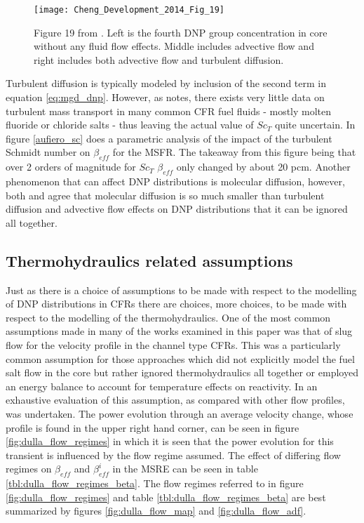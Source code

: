 \documentclass[review]{elsarticle}
\begin{document}
\begin{figure}[h]
   \centering
   \texttt{[image: Cheng\_Development\_2014\_Fig\_19]}
   \caption{Figure 19 from \cite{cheng_development_2014}. Left is the fourth
   DNP group concentration in core without any fluid flow effects. Middle
   includes advective flow and right includes both advective flow and
   turbulent diffusion.} 
   \label{fig:cheng_diffusion}
\end{figure}

Turbulent diffusion is typically modeled by inclusion of the second term in
equation \ref{eq:mgd_dnp}. However, as \cite{aufiero_calculating_2014} notes,
there exists very little data on turbulent mass transport in many common
CFR fuel fluids - mostly molten fluoride or chloride salts - thus leaving the
actual value of $Sc_{T}$ quite uncertain. In figure \ref{aufiero_sc}
\cite{aufiero_calculating_2014} does a parametric analysis of the impact of the
turbulent Schmidt number on $\beta_{eff}$ for the MSFR. The takeaway from this
figure being that over 2 orders of magnitude for $Sc_{T}$ $\beta_{eff}$ only
changed by about 20 pcm. Another phenomenon that can affect DNP distributions
is molecular diffusion, however, both \cite{aufiero_calculating_2014} and
\cite{cheng_development_2014} agree that molecular diffusion is so much smaller
than turbulent diffusion and advective flow effects on DNP distributions that it
can be ignored all together.

\subsection{Thermohydraulics related assumptions} \label{th_asm}
Just as there is a choice of assumptions to be made with respect to the
modelling of DNP distributions in CFRs there are choices, more choices, to be
made with respect to the modelling of the thermohydraulics. One of the most
common assumptions made in many of the works examined in this paper was that
of slug flow for the velocity profile in the channel type CFRs. This was a
particularly common assumption for those approaches which did not explicitly
model the fuel salt flow in the core but rather ignored thermohydraulics
all together or employed an energy balance to account for temperature effects
on reactivity. In \cite{dulla_interactions_2007} an exhaustive evaluation
of this assumption, as compared with other flow profiles, was undertaken.
The power evolution through an average velocity change, whose profile is found
in the upper right hand corner, can be seen in figure 
\ref{fig:dulla_flow_regimes}
in which it is seen that the power evolution for this transient is 
influenced by the flow regime assumed. The effect of differing flow regimes
on $\beta_{eff}$ and $\beta_{eff}^{i}$ in the MSRE can be seen in table
\ref{tbl:dulla_flow_regimes_beta}. The flow regimes referred to in figure
\ref{fig:dulla_flow_regimes} and table \ref{tbl:dulla_flow_regimes_beta} are
best 
summarized by figures \ref{fig:dulla_flow_map} and \ref{fig:dulla_flow_adf}.
\end{document}
